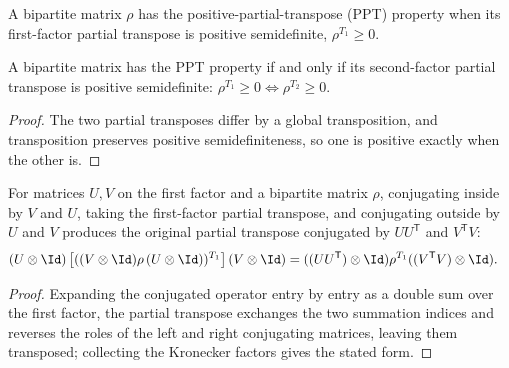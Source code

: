 \begin{definition}
    \label{def:is_ppt}
    \leanok
    A bipartite matrix $\rho$ has the positive-partial-transpose (PPT) property when
    its first-factor partial transpose is positive semidefinite, $\rho^{T_1}\ge 0$.
\end{definition}

\begin{theorem}
    \label{thm:is_ppt_iff_right}
    \leanok
    A bipartite matrix has the PPT property if and only if its second-factor
    partial transpose is positive semidefinite:
    $\rho^{T_1}\ge 0\iff\rho^{T_2}\ge 0$.
\end{theorem}

\begin{proof}
    \leanok
    The two partial transposes differ by a global transposition, and transposition
    preserves positive semidefiniteness, so one is positive exactly when the other
    is.
\end{proof}

\begin{theorem}
    \label{thm:partial_transpose_left_basis_change}
    \leanok
    For matrices $U,V$ on the first factor and a bipartite matrix $\rho$,
    conjugating inside by $V$ and $U$, taking the first-factor partial transpose,
    and conjugating outside by $U$ and $V$ produces the original partial transpose
    conjugated by $U U^{\mathsf T}$ and $V^{\mathsf T}V$:
    \begin{align}
        (U\otimes\Id)
        \left[((V\otimes\Id) \rho\,(U\otimes\Id))^{T_1}\right]
        (V\otimes\Id)
        &=((U U^{\mathsf T})\otimes\Id) \rho^{T_1}
            ((V^{\mathsf T}V)\otimes\Id).
        \notag
    \end{align}
\end{theorem}

\begin{proof}
    \leanok
    Expanding the conjugated operator entry by entry as a double sum over the first
    factor, the partial transpose exchanges the two summation indices and reverses
    the roles of the left and right conjugating matrices, leaving them transposed;
    collecting the Kronecker factors gives the stated form.
\end{proof}

